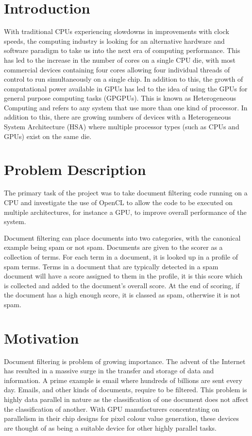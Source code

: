 \section{Introduction}

With traditional CPUs experiencing slowdowns in improvements with clock speeds,
the computing industry is looking for an alternative hardware and software
paradigm to take us into the next era of computing performance. This has led to
the increase in the number of cores on a single CPU die, with most commercial
devices containing four cores allowing four individual threads of control to run
simultaneously on a single chip. In addition to this, the growth of
computational power available in GPUs has led to the idea of using the GPUs for
general purpose computing tasks (GPGPUs). This is known as Heterogeneous
Computing and refers to any system that use more than one kind of processor. In
addition to this, there are growing numbers of devices with a Heterogeneous
System Architecture (HSA) where multiple processor types (such as CPUs and GPUs)
exist on the same die.

\section{Problem Description}

The primary task of the project was to take document filtering code running on a
CPU and investigate the use of OpenCL to allow the code to be executed on
multiple architectures, for instance a GPU, to improve overall performance of
the system.

Document filtering can place documents into two categories, with the canonical
example being spam or not spam. Documents are given to the scorer as a
collection of terms. For each term in a document, it is looked up in a profile
of spam terms. Terms in a document that are typically detected in a spam
document will have a score assigned to them in the profile, it is this score
which is collected and added to the document's overall score. At the end of
scoring, if the document has a high enough score, it is classed as spam,
otherwise it is not spam.

\section{Motivation}

Document filtering is problem of growing importance. The advent of the Internet
has resulted in a massive surge in the transfer and storage of data and
information. A prime example is email where hundreds of billions are sent every
day. Emails, and other kinds of documents, require to be filtered. This problem
is highly data parallel in nature as the classification of one document does not
affect the classification of another. With GPU manufacturers concentrating on
parallelism in their chip designs for pixel colour value generation, these
devices are thought of as being a suitable device for other highly parallel
tasks.


